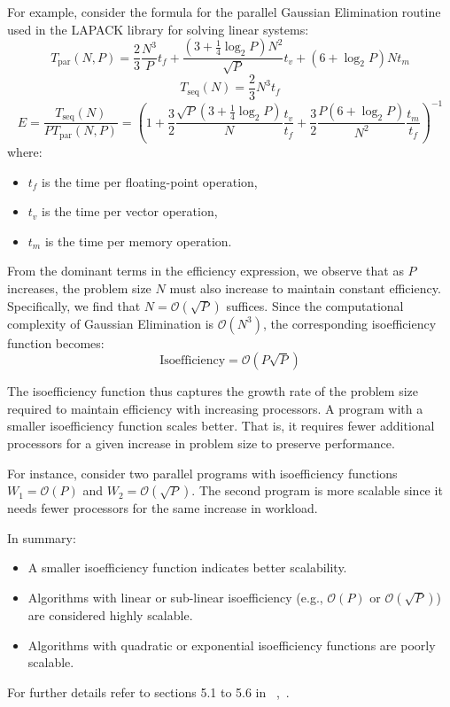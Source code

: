 \documentclass[12pt]{book}
\begin{document}
\begin{itemize}
For example, consider the formula for the parallel Gaussian Elimination routine used in the LAPACK library for solving linear systems:
\[
T_{\text{par}}(N,P) = \frac{2}{3} \frac{N^3}{P} t_f + \frac{(3 + \frac{1}{4} \log_2 P) N^2}{\sqrt{P}} t_v + (6 + \log_2 P) N t_m
\]
\[
T_{\text{seq}}(N) = \frac{2}{3} N^3 t_f
\]
\[
E = \frac{T_{\text{seq}}(N)}{P T_{\text{par}}(N,P)} = \left( 1 + \frac{3}{2} \frac{\sqrt{P}(3 + \frac{1}{4} \log_2 P)}{N} \frac{t_v}{t_f} + \frac{3}{2} \frac{P(6 + \log_2 P)}{N^2} \frac{t_m}{t_f} \right)^{-1}
\]
where:
\begin{itemize}
    \item $t_f$ is the time per floating-point operation,
    \item $t_v$ is the time per vector operation,
    \item $t_m$ is the time per memory operation.
\end{itemize}

From the dominant terms in the efficiency expression, we observe that as $P$ increases, the problem size $N$ must also increase to maintain constant efficiency. Specifically, we find that $N = \mathcal{O}(\sqrt{P})$ suffices. Since the computational complexity of Gaussian Elimination is $\mathcal{O}(N^3)$, the corresponding isoefficiency function becomes:
\[
\text{Isoefficiency} = \mathcal{O}(P \sqrt{P})
\]

The isoefficiency function thus captures the growth rate of the problem size required to maintain efficiency with increasing processors. A program with a smaller isoefficiency function scales better. That is, it requires fewer additional processors for a given increase in problem size to preserve performance.

For instance, consider two parallel programs with isoefficiency functions $W_1 = \mathcal{O}(P)$ and $W_2 = \mathcal{O}(\sqrt{P})$. The second program is more scalable since it needs fewer processors for the same increase in workload.

In summary:
\begin{itemize}
    \item A smaller isoefficiency function indicates better scalability.
    \item Algorithms with linear or sub-linear isoefficiency (e.g., $\mathcal{O}(P)$ or $\mathcal{O}(\sqrt{P})$) are considered highly scalable.
    \item Algorithms with quadratic or exponential isoefficiency functions are poorly scalable.
\end{itemize}

\end{itemize}
For further details refer to sections 5.1 to 5.6 in ~\cite{kumar1994introduction},~\cite{williams2009roofline}.
\end{document}
